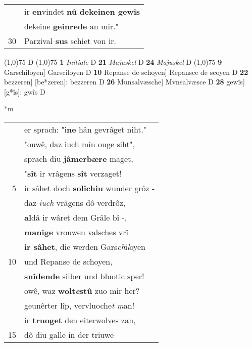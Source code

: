 \documentclass[8pt,a4paper,notitlepage]{article}
\begin{document}
\begin{table}[ht]
\begin{minipage}[t]{0.5\linewidth}
\begin{tabular}{rl}
 & ir \textbf{en}vindet \textbf{nû} \textbf{dekeinen gewîs}\\ 
 & dekeine \textbf{geinrede} an mir."\\ 
30 & Parzival \textbf{sus} schiet von ir.\\ 
\end{tabular}
\scriptsize
\line(1,0){75} \newline
D \newline
\line(1,0){75} \newline
\textbf{1} \textit{Initiale} D  \textbf{21} \textit{Majuskel} D  \textbf{24} \textit{Majuskel} D  \newline
\line(1,0){75} \newline
\textbf{9} Garschiloyen] Garsciloyen D \textbf{10} Repanse de schoyen] Repansce de scoyen D \textbf{22} bezzeren] [be*zeren]: bezzeren D \textbf{26} Munsalvæsche] Mvnsalvæsce D \textbf{28} gewîs] [g*îs]: gwîs D \newline
\end{minipage}
\hspace{0.5cm}
\begin{minipage}[t]{0.5\linewidth}
\small
\begin{center}*m
\end{center}
\begin{tabular}{rl}
 & er sprach: "i\textbf{ne} hân gevrâget niht."\\ 
 & "ouwê, daz iuch mîn ouge siht",\\ 
 & sprach diu \textbf{jâmerbære} maget,\\ 
 & "\textbf{sît} ir vrâgens \textbf{sît} verzaget!\\ 
5 & ir sâhet doch \textbf{solichiu} wunder grôz -\\ 
 & daz \textit{iuch} vrâgens dô verdrôz,\\ 
 & \textbf{al}dâ ir wâret dem Grâle bî -,\\ 
 & \textbf{manige} vrouwen valsches vrî\\ 
 & \textbf{ir sâhet}, die werden Gars\textit{ch}i\textit{l}oyen\\ 
10 & und Repanse de schoyen,\\ 
 & \textbf{snîdende} silber und bluotic sper!\\ 
 & owê, waz \textbf{wolt\textit{e}stû} zuo mir her?\\ 
 & geunêrter lîp, vervluoche\textit{t} \textit{m}an!\\ 
 & ir \textbf{truoget} den eiterwolves zan,\\ 
15 & dô diu galle in der triuwe\\ 

\end{tabular}
\end{minipage}
\end{table}
\end{document}
